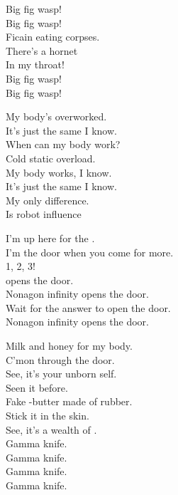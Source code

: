 Big fig wasp! \\
Big fig wasp! \\

Ficain eating corpses. \\
There's a hornet \\
In my throat! \\

Big fig wasp! \\
Big fig wasp! \\


My body's overworked. \\
It's just the same I know. \\
When can my body work? \\
Cold static overload. \\
My body works, I know. \\
It's just the same I know. \\
My only difference. \\
Is robot influence

I'm up here for the . \\
I'm the door when you come for more. \\

1, 2, 3! \\

 opens the door. \\
Nonagon infinity opens the door. \\
Wait for the answer to open the door. \\
Nonagon infinity opens the door. \\




Milk and honey for my body. \\
C'mon through the door. \\
See, it's your unborn self. \\
Seen it before. \\

Fake -butter made of rubber. \\
Stick it in the skin. \\
See, it's a wealth of . \\

Gamma knife. \\
Gamma knife. \\
Gamma knife. \\
Gamma knife. \\

